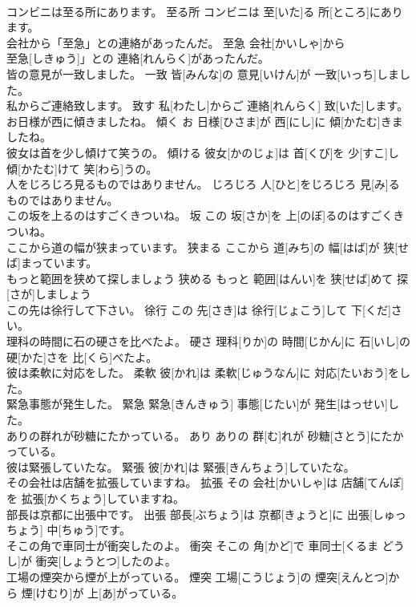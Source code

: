 \documentclass[8pt]{extreport}
\begin{document}
\begin{CJK}{UTF8}{min}
\\	コンビニは至る所にあります。	至る所	コンビニは 至[いた]る 所[ところ]にあります。	
\\	会社から「至急」との連絡があったんだ。	至急	会社[かいしゃ]から
\\	至急[しきゅう]」との 連絡[れんらく]があったんだ。	
\\	皆の意見が一致しました。	一致	皆[みんな]の 意見[いけん]が 一致[いっち]しました。	
\\	私からご連絡致します。	致す	私[わたし]からご 連絡[れんらく] 致[いた]します。	
\\	お日様が西に傾きましたね。	傾く	お 日様[ひさま]が 西[にし]に 傾[かたむ]きましたね。	
\\	彼女は首を少し傾けて笑うの。	傾ける	彼女[かのじょ]は 首[くび]を 少[すこ]し 傾[かたむ]けて 笑[わら]うの。	
\\	人をじろじろ見るものではありません。	じろじろ	人[ひと]をじろじろ 見[み]るものではありません。	
\\	この坂を上るのはすごくきついね。	坂	この 坂[さか]を 上[のぼ]るのはすごくきついね。	
\\	ここから道の幅が狭まっています。	狭まる	ここから 道[みち]の 幅[はば]が 狭[せば]まっています。	
\\	もっと範囲を狭めて探しましょう	狭める	もっと 範囲[はんい]を 狭[せば]めて 探[さが]しましょう	
\\	この先は徐行して下さい。	徐行	この 先[さき]は 徐行[じょこう]して 下[くだ]さい。	
\\	理科の時間に石の硬さを比べたよ。	硬さ	理科[りか]の 時間[じかん]に 石[いし]の 硬[かた]さを 比[くら]べたよ。	
\\	彼は柔軟に対応をした。	柔軟	彼[かれ]は 柔軟[じゅうなん]に 対応[たいおう]をした。	
\\	緊急事態が発生した。	緊急	緊急[きんきゅう] 事態[じたい]が 発生[はっせい]した。	
\\	ありの群れが砂糖にたかっている。	あり	ありの 群[む]れが 砂糖[さとう]にたかっている。	
\\	彼は緊張していたな。	緊張	彼[かれ]は 緊張[きんちょう]していたな。	
\\	その会社は店舗を拡張していますね。	拡張	その 会社[かいしゃ]は 店舗[てんぽ]を 拡張[かくちょう]していますね。	
\\	部長は京都に出張中です。	出張	部長[ぶちょう]は 京都[きょうと]に 出張[しゅっちょう] 中[ちゅう]です。	
\\	そこの角で車同士が衝突したのよ。	衝突	そこの 角[かど]で 車同士[くるま どうし]が 衝突[しょうとつ]したのよ。	
\\	工場の煙突から煙が上がっている。	煙突	工場[こうじょう]の 煙突[えんとつ]から 煙[けむり]が 上[あ]がっている。	

\end{CJK}
\end{document}
